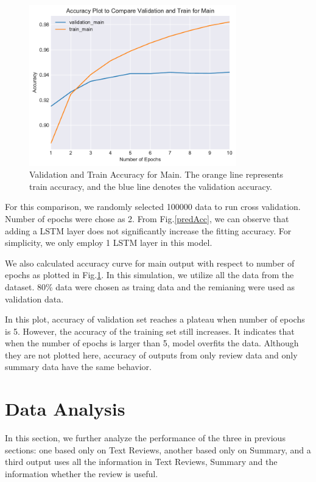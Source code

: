 \documentclass[letterpaper]{article} %
\begin{document}
\begin{figure}[!h]
\centering
\includegraphics[height=7cm,width=0.9\columnwidth]{train_val_main.pdf}  
\caption{Validation and Train Accuracy for Main. The orange line represents train accuracy, and the blue line denotes the validation accuracy.}
\label{epochs}
\end{figure}


For this comparison, we randomly selected 100000 data to run cross validation. Number of epochs were chose as 2. From Fig.\ref{predAcc}, we can observe that adding a LSTM layer does not significantly increase the fitting accuracy. For simplicity, we only employ 1 LSTM layer in this model.

We also calculated accuracy curve for main output with respect to number of epochs as plotted in Fig.\ref{epochs}. In this simulation, we utilize all the data from the dataset. 80\% data were chosen as traing data and the remianing were used as validation data.








In this plot, accuracy of validation set reaches a plateau when number of epochs is 5. However, the accuracy of the training set still increases. It indicates that when the number of epochs is larger than 5, model overfits the data. Although they are not plotted here, accuracy of outputs from only review data and only summary data have the same behavior. 

\section{Data Analysis}

In this section, we further analyze the performance of the three in previous sections: one based only on Text Reviews, another based only on Summary, and a third output uses all the information in Text Reviews, Summary and  the information whether the review is useful. 
\end{document}
